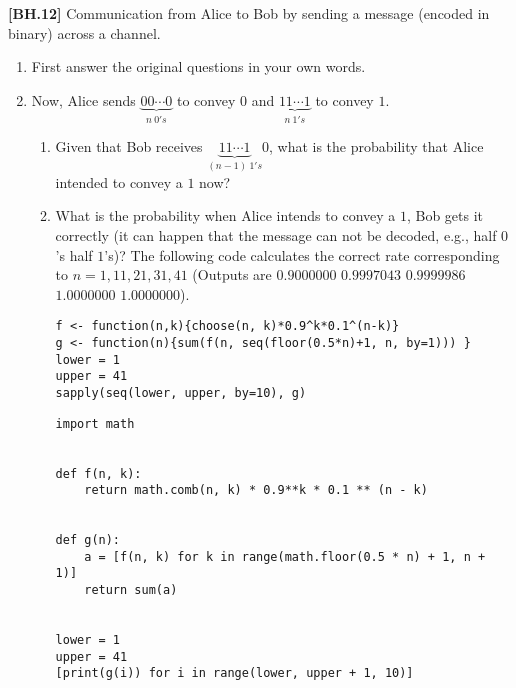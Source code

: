 \begin{exercise}
    \textbf{[BH.12]} Communication from Alice to Bob by sending a message (encoded in binary) across a channel.
    \begin{enumerate}
        \item First answer the original questions in your own words.
        \item Now, Alice sends $\underbrace{00\cdots0}_{n \  0's}$ to convey $0$ and $\underbrace{11\cdots1}_{n \  1's}$ to convey $1$.
        \begin{enumerate}
            \item Given that Bob receives $\underbrace{11\cdots1}_{(n-1) \ 1's}0$, what is the probability that Alice intended to convey a $1$ now?
            \item What is the probability when Alice intends to convey a $1$, Bob gets it correctly (it can happen that the message can not be decoded, e.g., half $0$'s half $1$'s)? The following code calculates the correct rate corresponding to $n=1,11,21,31,41$  (Outputs are $0.9000000$ $0.9997043$ $0.9999986$ $1.0000000$ $1.0000000$).
            \begin{verbatim}
f <- function(n,k){choose(n, k)*0.9^k*0.1^(n-k)}
g <- function(n){sum(f(n, seq(floor(0.5*n)+1, n, by=1))) }
lower = 1
upper = 41
sapply(seq(lower, upper, by=10), g)
            \end{verbatim}

\begin{verbatim}
import math


def f(n, k):
    return math.comb(n, k) * 0.9**k * 0.1 ** (n - k)


def g(n):
    a = [f(n, k) for k in range(math.floor(0.5 * n) + 1, n + 1)]
    return sum(a)


lower = 1
upper = 41
[print(g(i)) for i in range(lower, upper + 1, 10)]
\end{verbatim}
        \end{enumerate}

    \end{enumerate}
\end{exercise}
